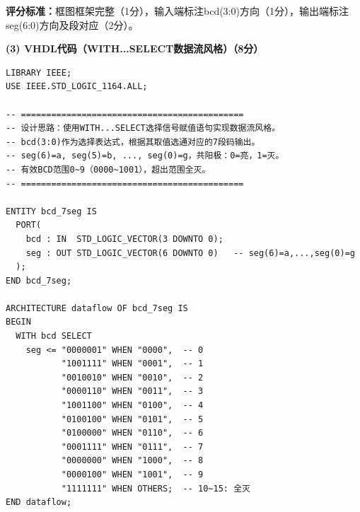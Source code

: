\begin{center}
\end{center}

\textbf{评分标准：}框图框架完整（1分），输入端标注bcd(3:0)方向（1分），输出端标注seg(6:0)方向及段对应（2分）。

\vspace{0.3cm}

\textbf{(3) VHDL代码（WITH...SELECT数据流风格）（8分）}

\begin{lstlisting}[caption={BCD码--七段译码器——WITH-SELECT数据流风格}]
LIBRARY IEEE;
USE IEEE.STD_LOGIC_1164.ALL;

-- ============================================
-- 设计思路：使用WITH...SELECT选择信号赋值语句实现数据流风格。
-- bcd(3:0)作为选择表达式，根据其取值选通对应的7段码输出。
-- seg(6)=a, seg(5)=b, ..., seg(0)=g，共阳极：0=亮，1=灭。
-- 有效BCD范围0~9（0000~1001），超出范围全灭。
-- ============================================

ENTITY bcd_7seg IS
  PORT(
    bcd : IN  STD_LOGIC_VECTOR(3 DOWNTO 0);
    seg : OUT STD_LOGIC_VECTOR(6 DOWNTO 0)   -- seg(6)=a,...,seg(0)=g
  );
END bcd_7seg;

ARCHITECTURE dataflow OF bcd_7seg IS
BEGIN
  WITH bcd SELECT
    seg <= "0000001" WHEN "0000",  -- 0
           "1001111" WHEN "0001",  -- 1
           "0010010" WHEN "0010",  -- 2
           "0000110" WHEN "0011",  -- 3
           "1001100" WHEN "0100",  -- 4
           "0100100" WHEN "0101",  -- 5
           "0100000" WHEN "0110",  -- 6
           "0001111" WHEN "0111",  -- 7
           "0000000" WHEN "1000",  -- 8
           "0000100" WHEN "1001",  -- 9
           "1111111" WHEN OTHERS;  -- 10~15: 全灭
END dataflow;
\end{lstlisting}

